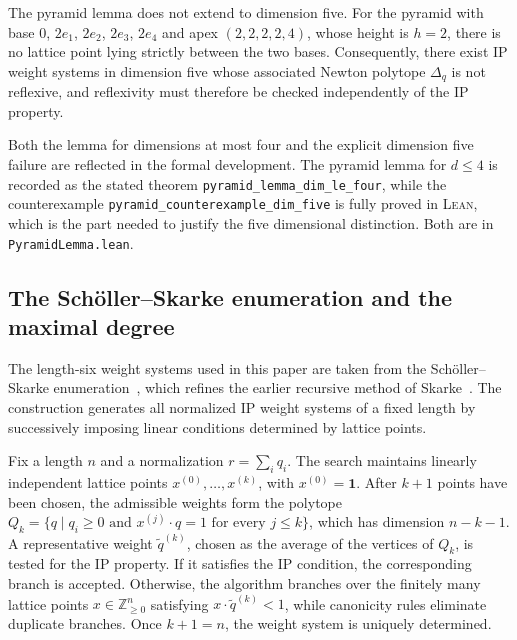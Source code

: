 \documentclass[appliedmath,article,submit,moreauthors]{Definitions/mdpi}
\newcommand{\Z}{\mathbb{Z}}
\newcommand{\Lean}{\textsc{Lean}}
\newcommand{\Dq}{\Delta_q}
\begin{document}
\begin{Theorem}
\label{thm:watershed}
The pyramid lemma does not extend to dimension five. For the pyramid with base
\(0\), \(2e_1\), \(2e_2\), \(2e_3\), \(2e_4\) and apex \((2,2,2,2,4)\), whose
height is \(h=2\), there is no lattice point lying strictly between the two
bases. Consequently, there exist IP weight systems in dimension five whose
associated Newton polytope \(\Dq\) is not reflexive, and reflexivity must
therefore be checked independently of the IP property.
\end{Theorem}


Both the lemma for dimensions at most four and the explicit dimension five
failure are reflected in the formal development.  The pyramid lemma for \(d\leq
4\) is recorded as the stated theorem \nolinkurl{pyramid\_lemma\_dim\_le\_four},
while the counterexample \nolinkurl{pyramid\_counterexample\_dim\_five} is fully
proved in \Lean, which is the part needed to justify the five dimensional
distinction.  Both are in \nolinkurl{PyramidLemma.lean}.

\subsection{The Sch\"oller--Skarke enumeration and the maximal degree}
\label{sec:math-enumeration}

The length-six weight systems used in this paper are taken from the
Sch\"oller--Skarke enumeration~\cite{Scholler2019}, which refines the earlier
recursive method of Skarke~\cite{Skarke1996}. The construction generates all
normalized IP weight systems of a fixed length by successively imposing linear
conditions determined by lattice points.

Fix a length \(n\) and a normalization \(r=\sum_i q_i\). The search maintains
linearly independent lattice points \(x^{(0)},\ldots,x^{(k)}\), with
\(x^{(0)}=\mathbf{1}\). After \(k+1\) points have been chosen, the admissible
weights form the polytope \(Q_k=\{q\mid q_i\geq0\text{ and }x^{(j)}\cdot
q=1\text{ for every }j\leq k\}\), which has dimension \(n-k-1\). A
representative weight \(\widetilde q^{(k)}\), chosen as the average of the
vertices of \(Q_k\), is tested for the IP property. If it satisfies the IP
condition, the corresponding branch is accepted. Otherwise, the algorithm
branches over the finitely many lattice points \(x\in\Z_{\geq0}^n\) satisfying
\(x\cdot\widetilde q^{(k)}<1\), while canonicity rules eliminate duplicate
branches. Once \(k+1=n\), the weight system is uniquely determined.
\end{document}
